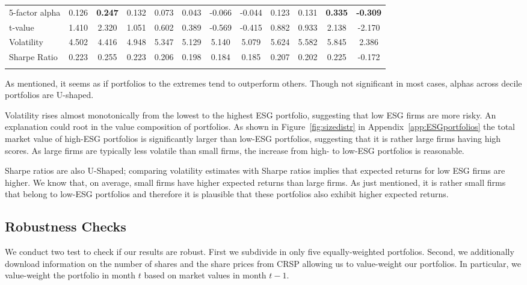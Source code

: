 \documentclass[11pt]{article}
\begin{document}
\begin{table}[!htbp]
{\begin{tabular}{@{\extracolsep{5pt}} lccccccccccc}
			5-factor alpha & 0.126 & \textbf{0.247} & 0.132 & 0.073 & 0.043 & -0.066 & -0.044 & 0.123 & 0.131 &\textbf{0.335} & \textbf{-0.309} \\ 
			t-value & 1.410 & 2.320 & 1.051 & 0.602 & 0.389 & -0.569 & -0.415 & 0.882 & 0.933 & 2.138 & -2.170 \\[2.5ex] 
			
			Volatility & 4.502 & 4.416 & 4.948 & 5.347 & 5.129 & 5.140 & 5.079 & 5.624 & 5.582 & 5.845 & 2.386 \\ 
			Sharpe Ratio & 0.223 & 0.255 & 0.223 & 0.206 & 0.198 & 0.184 & 0.185 & 0.207 & 0.202 & 0.225 & -0.172 \\ 
			\hline \\[-1.8ex] 
	\end{tabular}}
\end{table} 

As mentioned, it seems as if portfolios to the extremes tend to outperform others. Though not significant in most cases, alphas  across decile portfolios are U-shaped. 

Volatility rises almost monotonically from the lowest to the highest ESG portfolio, suggesting that low ESG firms are more risky. An explanation could root in the value composition of portfolios. As shown in Figure~\ref{fig:sizedistr} in Appendix~\ref{app:ESGportfolios} the total market value of high-ESG portfolios is significantly larger than low-ESG portfolios, suggesting that it is rather large firms having high scores. As large firms are typically less volatile than small firms, the increase from high- to low-ESG portfolios is reasonable.

Sharpe ratios are also U-Shaped; comparing volatility estimates with Sharpe ratios implies that expected returns for low ESG firms are higher. We know that, on average, small firms have higher expected returns than large firms. As just mentioned, it is rather small firms that belong to low-ESG portfolios and therefore it is plausible that these portfolios also exhibit higher expected returns. 

\subsection{Robustness Checks}

We conduct two test to check if our results are robust. First we subdivide in only five equally-weighted portfolios. Second, we additionally download information on the number of shares and the share prices from CRSP allowing us to value-weight our portfolios. In particular, we value-weight the portfolio in month $t$ based on market values in month $t-1$. 
\end{document}
